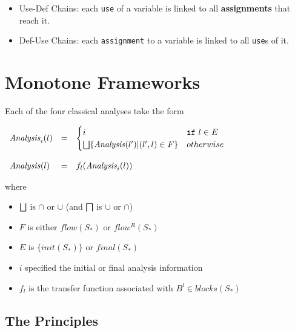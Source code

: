 \begin{itemize}
\item Use-Def Chains: each \texttt{use} of a variable is linked to all
  \textbf{assignments} that reach it.
\item Def-Use Chains: each \texttt{assignment} to a variable is linked
  to all \texttt{use}s of it.
\end{itemize}


\section{Monotone Frameworks}

Each of the four classical analyses take the form

\begin{math}
  \begin{array}{lcl}
    \mathit{Analysis}_i(l) & = &
                                 \begin{cases}
                                   i & \mathtt{if} \text{ } l \in E \\
                                   \bigsqcup \{ \mathit{Analysis}(l') | (l', l) \in F \} & otherwise
                                 \end{cases} \\
    \\
    \mathit{Analysis}(l) & = & f_l(\mathit{Analysis}_i(l)) \\
  \end{array}
\end{math}

where

\begin{itemize}
\item $\bigsqcup$ is $\cap$ or $\cup$ (and $\bigsqcap$ is $\cup$ or $\cap$)
\item $F$ is either $flow(S_*)$ or $flow^R(S_*)$
\item $E$ is $\{ init(S_*) \}$ or $final(S_*)$
\item $i$ specified the initial or final analysis information
\item $f_l$ is the transfer function associated with $B^l \in blocks(S_*)$
\end{itemize}

\subsection{The Principles}

